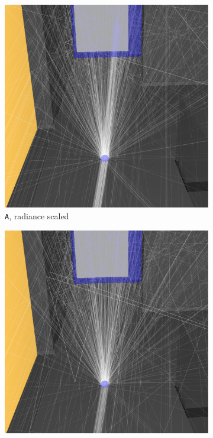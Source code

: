 \begin{figure}
	\centering
	\begin{subfigure}[t]{0.49\linewidth}
		\includegraphics[width=\textwidth]{chapters/chapter_results/correct2pathsscaled}
		\caption{\texttt{A}, radiance scaled}
		\label{correct2pathsscaled}
	\end{subfigure}
	\begin{subfigure}[t]{0.49\linewidth}
		\includegraphics[width=\textwidth]{chapters/chapter_results/wrong2pathsscaled}

\end{subfigure}
\end{figure}
